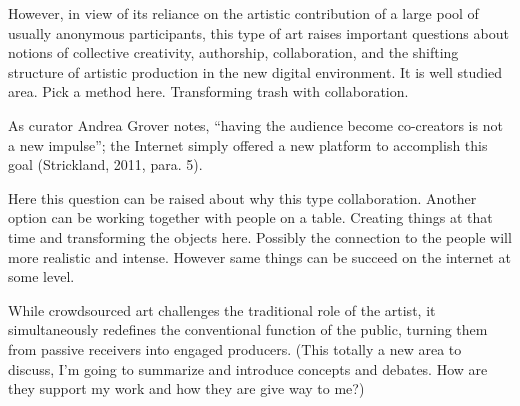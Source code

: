 However, in view of its reliance on the artistic contribution of a large pool of usually anonymous participants, this type of art raises important questions about notions of collective creativity, authorship, collaboration, and the shifting structure of artistic production in the new digital environment. It is well studied area. Pick a method here. Transforming trash with collaboration.

As curator Andrea Grover notes, “having the audience become co-creators is not a new impulse”; the Internet simply offered a new platform to accomplish this goal (Strickland, 2011, para. 5).

Here this question can be raised about why this type collaboration. Another option can be working together with people on a table. Creating things at that time and transforming the objects here. Possibly the connection to the people will more realistic and intense. However same things can be succeed on the internet at some level. 

While crowdsourced art challenges the traditional role of the artist, it simultaneously redefines the conventional function of the public, turning them from passive receivers into engaged producers. (This totally a new area to discuss, I'm going to summarize and introduce concepts and debates. How are they support my work and how they are give way to me?)




